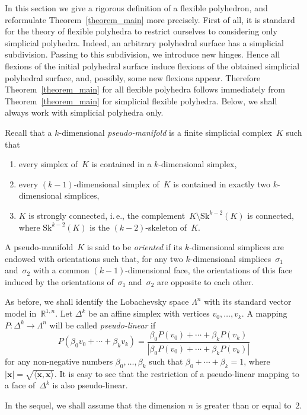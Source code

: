 \documentclass[reqno,tbtags,12pt]{amsart}
\numberwithin{equation}{section}
\newcommand{\R}{\mathbb{R}}
\newcommand{\bx}{\mathbf{x}}
\theoremstyle{definition}
\begin{document}
In this section we give a rigorous definition of a flexible polyhedron, and reformulate Theorem~\ref{theorem_main} more precisely. First of all, it is standard for the  theory of flexible polyhedra to restrict ourselves to considering only simplicial polyhedra. Indeed, an arbitrary polyhedral surface has a simplicial subdivision. Passing to this subdivision, we introduce new hinges. Hence all flexions of the initial polyhedral surface induce flexions of the obtained simplicial polyhedral surface, and, possibly, some new flexions appear. Therefore Theorem~\ref{theorem_main} for all flexible polyhedra follows immediately from Theorem~\ref{theorem_main} for simplicial flexible polyhedra. Below, we shall always work with simplicial polyhedra only.

Recall that a $k$-dimensional \textit{pseudo-manifold\/} is a finite simplicial complex~$K$ such that
\begin{enumerate}
\item every simplex of~$K$ is contained in a $k$-dimensional simplex,
\item every $(k-1)$-dimensional  simplex of~$K$ is contained in exactly two $k$-dimensional simplices,
\item $K$ is strongly connected, i.\,e., the complement~$K\setminus\mathrm{Sk}^{k-2}(K)$ is connected, where $\mathrm{Sk}^{k-2}(K)$ is the $(k-2)$-skeleton of~$K$.
\end{enumerate}
A pseudo-manifold~$K$ is said to be \textit{oriented\/} if its $k$-dimensional simplices are endowed with orientations such that, for any two $k$-dimensional simplices~$\sigma_1$ and~$\sigma_2$ with a common $(k-1)$-dimensional face, the orientations  of  this face induced by the orientations of~$\sigma_1$ and~$\sigma_2$ are opposite to each other.



As before, we shall identify the Lobachevsky space $\Lambda^n$ with its standard vector model in~$\R^{1,n}$.
Let $\Delta^k$ be an affine simplex with vertices $v_0,\ldots,v_k$. A mapping $ P\colon\Delta^k\to\Lambda^n$ will be  called \textit{pseudo-linear\/} if 
$$
 P(\beta_0v_0+\cdots+\beta_kv_k)=\frac{\beta_0 P(v_0)+\cdots+\beta_k P(v_k)}{
|\beta_0 P(v_0)+\cdots+\beta_k P(v_k)|}
$$
for any non-negative numbers $\beta_0,\ldots,\beta_k$ such that $\beta_0+\cdots+\beta_k=1$, where $|\bx|=\sqrt{\langle\bx,\bx\rangle}$. It is easy to see that the restriction of a pseudo-linear mapping to a face of~$\Delta^k$ is also pseudo-linear.


In the sequel, we shall assume that the dimension $n$ is greater than or equal to~$2$.
\end{document}
